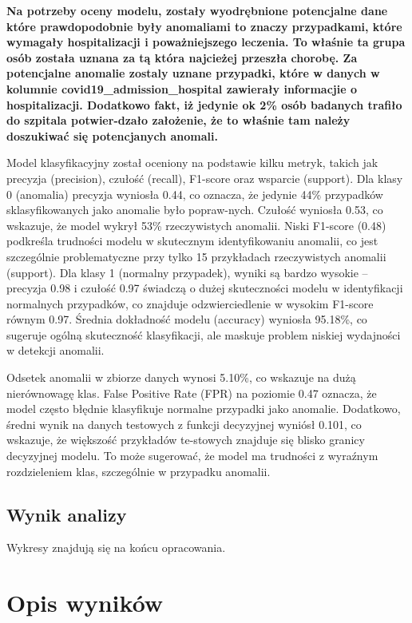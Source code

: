 \documentclass[a4paper,fleqn]{cas-dc}
\begin{document}
\textbf{Na potrzeby oceny modelu, zostały wyodrębnione potencjalne dane które prawdopodobnie były anomaliami to znaczy przypadkami, które wymagały hospitalizacji i poważniejszego leczenia. To właśnie ta grupa osób została uznana za tą która najcieżej przeszła chorobę. Za potencjalne anomalie zostaly uznane przypadki, które w danych w kolumnie covid19\_admission\_hospital zawierały informacjie o  hospitalizacji. Dodatkowo fakt, iż jedynie ok 2\% osób badanych trafiło do szpitala potwier-dzało założenie, że to właśnie tam należy doszukiwać się potencjanych anomali.}  

Model klasyfikacyjny został oceniony na podstawie kilku metryk, takich jak precyzja (precision), czułość (recall), F1-score oraz wsparcie (support). Dla klasy 0 (anomalia) precyzja wyniosła 0.44, co oznacza, że jedynie 44\% przypadków sklasyfikowanych jako anomalie było popraw-nych. Czułość wyniosła 0.53, co wskazuje, że model wykrył 53\% rzeczywistych anomalii. Niski F1-score (0.48) podkreśla trudności modelu w skutecznym identyfikowaniu anomalii, co jest szczególnie problematyczne przy tylko 15 przykładach rzeczywistych anomalii (support). Dla klasy 1 (normalny przypadek), wyniki są bardzo wysokie – precyzja 0.98 i czułość 0.97 świadczą o dużej skuteczności modelu w identyfikacji normalnych przypadków, co znajduje odzwierciedlenie w wysokim F1-score równym 0.97. Średnia dokładność modelu (accuracy) wyniosła 95.18\%, co sugeruje ogólną skuteczność klasyfikacji, ale maskuje problem niskiej wydajności w detekcji anomalii.

Odsetek anomalii w zbiorze danych wynosi 5.10\%, co wskazuje na dużą nierównowagę klas. False Positive Rate (FPR) na poziomie 0.47 oznacza, że model często błędnie klasyfikuje normalne przypadki jako anomalie. Dodatkowo, średni wynik na danych testowych z funkcji decyzyjnej wyniósł 0.101, co wskazuje, że większość przykładów te-stowych znajduje się blisko granicy decyzyjnej modelu. To może sugerować, że model ma trudności z wyraźnym rozdzieleniem klas, szczególnie w przypadku anomalii.


\subsection{Wynik analizy}

 Wykresy znajdują się na końcu opracowania.


\section{Opis wyników}
\end{document}
